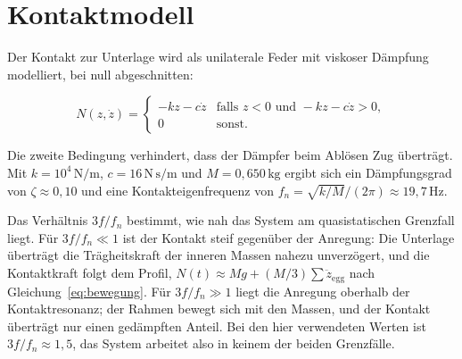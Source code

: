 \documentclass[12pt,a4paper]{report}
\begin{document}
\section{Kontaktmodell}
\label{sec:anh-kontaktmodell}

Der Kontakt zur Unterlage wird als unilaterale Feder mit viskoser
Dämpfung modelliert, bei null abgeschnitten:

\begin{equation}
N(z, \dot{z}) =
\begin{cases}
-k z - c \dot{z} & \text{falls } z < 0 \text{ und } -k z - c \dot{z} > 0,\\
0 & \text{sonst.}
\end{cases}
\label{eq:kontakt}
\end{equation}

Die zweite Bedingung verhindert, dass der Dämpfer beim Ablösen Zug
überträgt. Mit $k = 10^{4}\,\mathrm{N/m}$, $c = 16\,\mathrm{N\,s/m}$ und
$M = 0{,}650\,\mathrm{kg}$ ergibt sich ein Dämpfungsgrad von
$\zeta \approx 0{,}10$ und eine Kontakteigenfrequenz von
$f_n = \sqrt{k/M}/(2\pi) \approx 19{,}7\,\mathrm{Hz}$.

Das Verhältnis $3f/f_n$ bestimmt, wie nah das System am quasistatischen
Grenzfall liegt. Für $3f/f_n \ll 1$ ist der Kontakt steif gegenüber der
Anregung: Die Unterlage überträgt die Trägheitskraft der inneren Massen
nahezu unverzögert, und die Kontaktkraft folgt dem Profil,
$N(t) \approx Mg + (M/3)\sum \ddot{z}_{\mathrm{egg}}$ nach
Gleichung~\eqref{eq:bewegung}. Für $3f/f_n \gg 1$ liegt die Anregung
oberhalb der Kontaktresonanz; der Rahmen bewegt sich mit den Massen, und
der Kontakt überträgt nur einen gedämpften Anteil. Bei den hier
verwendeten Werten ist $3f/f_n \approx 1{,}5$, das System arbeitet also
in keinem der beiden Grenzfälle.
\end{document}
